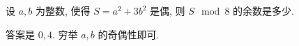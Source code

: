 \begin{prob}
\label{prob:prob-1}
设 $a, b$ 为整数, 使得 $S = a^2  + 3b^2$ 是偶,
则 $S \mod 8$ 的余数是多少.
\end{prob}

\begin{soln}
答案是 $\boxed{0, 4.}$
穷举 $a, b$ 的奇偶性即可.
\end{soln}
